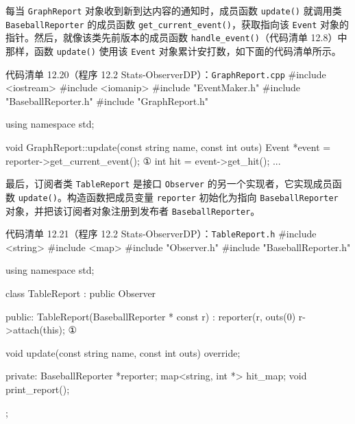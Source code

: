 每当 \texttt{Graph\allowbreak{}Report} 对象收到新到达内容的通知时，成员函数 \texttt{update()} 就调用类 \texttt{Baseball\allowbreak{}Reporter} 的成员函数 \texttt{get\_\allowbreak{}current\_\allowbreak{}event(\allowbreak{})\allowbreak{}}，获取指向该 \texttt{Event} 对象的指针。然后，就像该类先前版本的成员函数 \texttt{handle\_\allowbreak{}event(\allowbreak{})\allowbreak{}}（代码清单 12.8）中那样，函数 \texttt{update()} 使用该 \texttt{Event} 对象累计安打数，如下面的代码清单所示。

\begin{codeboxt}{代码清单 12.20（程序 12.2 Stats-ObserverDP）：\texttt{Graph\allowbreak{}Report.\allowbreak{}cpp}}
#include <iostream>
#include <iomanip>
#include "EventMaker.h"
#include "BaseballReporter.h"
#include "GraphReport.h"

using namespace std;

void GraphReport::update(const string name, const int outs)
{
    Event  *event = reporter->get_current_event();        ①
    int     hit   = event->get_hit();
    ...
}
\end{codeboxt}
\par

最后，订阅者类 \texttt{Table\allowbreak{}Report} 是接口 \texttt{Observer} 的另一个实现者，它实现成员函数 \texttt{update()}。构造函数把成员变量 \texttt{reporter} 初始化为指向 \texttt{Baseball\allowbreak{}Reporter} 对象，并把该订阅者对象注册到发布者 \texttt{Baseball\allowbreak{}Reporter}。

\begin{codeboxt}{代码清单 12.21（程序 12.2 Stats-ObserverDP）：\texttt{Table\allowbreak{}Report.\allowbreak{}h}}
#include <string>
#include <map>
#include "Observer.h"
#include "BaseballReporter.h"

using namespace std;

class TableReport : public Observer
{
public:
    TableReport(BaseballReporter * const r) : reporter(r, outs(0)
    {
        r->attach(this);                                  ①
    }

    void update(const string name, const int outs) override;

private:
    BaseballReporter *reporter;
    map<string, int *> hit_map;
    void print_report();
};
\end{codeboxt}
\par

